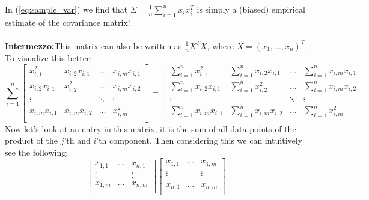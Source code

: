 			In (\ref{eq:sample_var}) we find that $\Sigma = \frac{1}{n}\sum_{i=1}^{n} x_ix_i^T$ is simply a (biased) empirical estimate of the covariance matrix! \\\\
			\textbf{Intermezzo:}This matrix can also be written as $\frac{1}{n}X^TX$, where $X = (x_1,...,x_n)^T$. To visualize this better:\\
			\begin{equation}
				\sum_{i=1}^{n}
				\begin{bmatrix}
					x_{i,1}^2 & x_{i,2}x_{i,1} & \dots & x_{i,m}x_{i,1}\\
					x_{i,2}x_{i,1} & x_{i,2}^2 & \dots & x_{i,m}x_{i,2}\\
					\vdots & & \ddots & \vdots\\
					x_{i,m}x_{i,1}& x_{i,m}x_{i,2}& \dots & x_{i,m}^2\\
				\end{bmatrix} = 
				\begin{bmatrix}
					\sum_{i=1}^{n}x_{i,1}^2 & \sum_{i=1}^{n}x_{i,2}x_{i,1} & \dots & \sum_{i=1}^{n}x_{i,m}x_{i,1}\\
					\sum_{i=1}^{n}x_{i,2}x_{i,1} & \sum_{i=1}^{n}x_{i,2}^2 & \dots & \sum_{i=1}^{n}x_{i,m}x_{i,2}\\
					\vdots & & \ddots & \vdots\\
					\sum_{i=1}^{n}x_{i,m}x_{i,1}& \sum_{i=1}^{n}x_{i,m}x_{i,2}& \dots & \sum_{i=1}^{n}x_{i,m}^2\\
				\end{bmatrix}
			\end{equation}
			Now let's look at an entry in this matrix, it is the sum of all data points of the product of the $j$'th and $i$'th component. Then considering this we can intuitively see the following:
			\begin{equation}
				\begin{bmatrix}
				x_{1,1}& \dots & x_{n,1}\\
				\vdots & & \vdots\\
				x_{1,m} & \dots & x_{n,m}\\
				\end{bmatrix}
				\begin{bmatrix}
				x_{1,1} & \dots & x_{1,m}\\
				\vdots & & \vdots\\
				 & & \\
				x_{n,1} & \dots & x_{n,m}\\
				\end{bmatrix}
			\end{equation}
